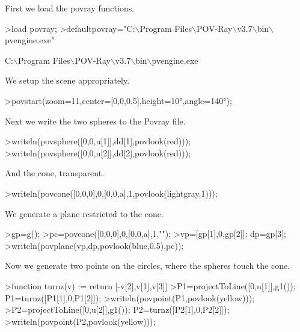 \documentclass{article}
\begin{document}
\begin{eulernotebook}
\begin{eulercomment}
\begin{eulercomment}
\begin{eulercomment}
\begin{eulercomment}
\begin{eulercomment}
\begin{eulercomment}
\begin{eulercomment}
\begin{eulercomment}
\begin{eulercomment}
First we load the povray functions.
\end{eulercomment}
\begin{eulerprompt}
>load povray;
>defaultpovray="C:\(\backslash\)Program Files\(\backslash\)POV-Ray\(\backslash\)v3.7\(\backslash\)bin\(\backslash\)pvengine.exe"
\end{eulerprompt}
\begin{euleroutput}
  C:\(\backslash\)Program Files\(\backslash\)POV-Ray\(\backslash\)v3.7\(\backslash\)bin\(\backslash\)pvengine.exe
\end{euleroutput}
\begin{eulercomment}
We setup the scene appropriately.
\end{eulercomment}
\begin{eulerprompt}
>povstart(zoom=11,center=[0,0,0.5],height=10°,angle=140°);
\end{eulerprompt}
\begin{eulercomment}
Next we write the two spheres to the Povray file.
\end{eulercomment}
\begin{eulerprompt}
>writeln(povsphere([0,0,u[1]],dd[1],povlook(red)));
>writeln(povsphere([0,0,u[2]],dd[2],povlook(red)));
\end{eulerprompt}
\begin{eulercomment}
And the cone, transparent.
\end{eulercomment}
\begin{eulerprompt}
>writeln(povcone([0,0,0],0,[0,0,a],1,povlook(lightgray,1)));
\end{eulerprompt}
\begin{eulercomment}
We generate a plane restricted to the cone.
\end{eulercomment}
\begin{eulerprompt}
>gp=g();
>pc=povcone([0,0,0],0,[0,0,a],1,"");
>vp=[gp[1],0,gp[2]]; dp=gp[3];
>writeln(povplane(vp,dp,povlook(blue,0.5),pc));
\end{eulerprompt}
\begin{eulercomment}
Now we generate two points on the circles, where the spheres touch the
cone.
\end{eulercomment}
\begin{eulerprompt}
>function turnz(v) := return [-v[2],v[1],v[3]]
>P1=projectToLine([0,u[1]],g1()); P1=turnz([P1[1],0,P1[2]]);
>writeln(povpoint(P1,povlook(yellow)));
>P2=projectToLine([0,u[2]],g1()); P2=turnz([P2[1],0,P2[2]]);
>writeln(povpoint(P2,povlook(yellow)));
\end{eulerprompt}

\end{eulercomment}
\end{eulercomment}
\end{eulercomment}
\end{eulercomment}
\end{eulercomment}
\end{eulercomment}
\end{eulercomment}
\end{eulercomment}
\end{eulernotebook}
\end{document}
